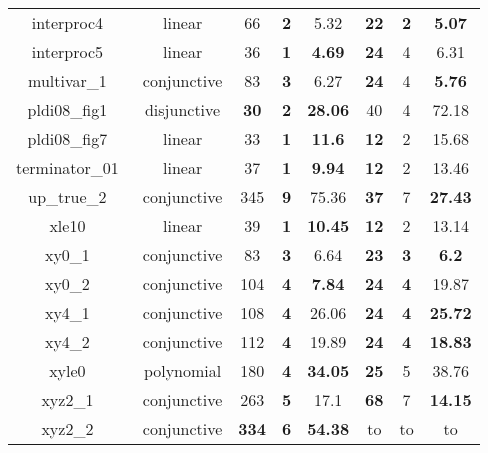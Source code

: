 \begin{table}[t]
\begin{tabular}{l c | c c c | c c c |}
\multicolumn{1}{|c|}{interproc4~\cite{jeannet2010interproc}}	&linear 		&66 	&\textbf{2} 		&5.32       		&\textbf{22}	&\textbf{2} &\textbf{5.07}  \\ 
\multicolumn{1}{|c|}{interproc5~\cite{jeannet2010interproc}}	&linear			&36		&\textbf{1}			&\textbf{4.69}		&\textbf{24} 	&4			&6.31  \\ 
\multicolumn{1}{|c|}{multivar\_1~\cite{jeannet2010interproc}}	&conjunctive	&83 	&\textbf{3} 		&6.27       		&\textbf{24}	&4 			&\textbf{5.76}  \\ 
\multicolumn{1}{|c|}{pldi08\_fig1~\cite{gulavani2008automatically}}&disjunctive	&\textbf{30} &\textbf{2}	&\textbf{28.06}   	&40 			&4 			&72.18  \\
\multicolumn{1}{|c|}{pldi08\_fig7~\cite{gulavani2008automatically}}&linear		&33		&\textbf{1}			&\textbf{11.6}		&\textbf{12}	&2			&15.68	\\
\multicolumn{1}{|c|}{terminator\_01~\cite{Dirk:SVCOMP:2016}}	&linear 		&37 	&\textbf{1} 		&\textbf{9.94}      &\textbf{12}	&2 			&13.46  \\ 
\multicolumn{1}{|c|}{up\_true\_2~\cite{isil2013inductive}}		&conjunctive	&345	&\textbf{9} 		&75.36    			&\textbf{37}	&7 			&\textbf{27.43}  \\ 
\multicolumn{1}{|c|}{xle10~\cite{sharma2012interpolants}}		&linear 		&39 	&\textbf{1} 		&\textbf{10.45}      &\textbf{12}	&2 			&13.14  \\ 
\multicolumn{1}{|c|}{xy0\_1~\cite{sharma2012interpolants}}		&conjunctive	&83 	&\textbf{3} 		&6.64       		&\textbf{23}	&\textbf{3}	&\textbf{6.2}  \\ 
\multicolumn{1}{|c|}{xy0\_2~\cite{sharma2012interpolants}}		&conjunctive	&104	&\textbf{4} 		&\textbf{7.84}    	&\textbf{24}	&\textbf{4}	&19.87  \\ 
\multicolumn{1}{|c|}{xy4\_1~\cite{sharma2012interpolants}}		&conjunctive	&108	&\textbf{4} 		&26.06    			&\textbf{24}	&\textbf{4}	&\textbf{25.72}  \\ 
\multicolumn{1}{|c|}{xy4\_2~\cite{sharma2012interpolants}}		&conjunctive	&112	&\textbf{4} 		&19.89    			&\textbf{24}	&\textbf{4}	&\textbf{18.83}  \\ 
\multicolumn{1}{|c|}{xyle0~\cite{sharma2012interpolants}}		&polynomial 	&180	&\textbf{4} 		&\textbf{34.05}    	&\textbf{25}	&5 			&38.76  \\ 
\multicolumn{1}{|c|}{xyz2\_1~\cite{sharma2012interpolants}}		&conjunctive	&263 	&\textbf{5}			&17.1				&\textbf{68}	&7			&\textbf{14.15}\\
\multicolumn{1}{|c|}{xyz2\_2~\cite{sharma2012interpolants}}		&conjunctive	&\textbf{334}	&\textbf{6}	&\textbf{54.38}		&to 			&to 		&to	\\

\end{tabular}
\end{table}
